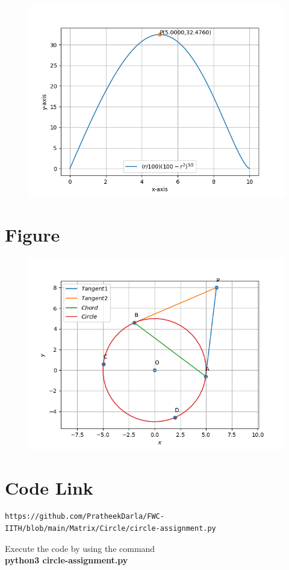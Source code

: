 \documentclass[journal,10.75pt,twocolumn]{IEEEtran}
\begin{document}
\begin{figure}[h]
    \centering
\includegraphics[width=\columnwidth]{figs/fig-opt.png}
    \label{fig:my_label}
\end{figure}

\section{\textbf{Figure}}
\begin{figure}[h]
    \centering
\includegraphics[width=\columnwidth]{figs/fig-circle1.png}
    \label{fig:my_label}
\end{figure}

\section{\textbf{Code Link}}

\begin{lstlisting}
https://github.com/PratheekDarla/FWC-IITH/blob/main/Matrix/Circle/circle-assignment.py
\end{lstlisting}
Execute the code by using the command\\
\textbf{python3 circle-assignment.py}
\end{document}
